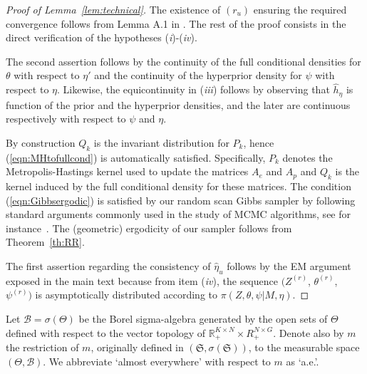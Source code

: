 \documentclass[11pt]{amsart}
\theoremstyle{definition}
\begin{document}
\begin{proof}[Proof of Lemma~\ref{lem:technical}] The existence of
$(r_u)$ ensuring the required convergence follows from Lemma A.1 in 
\cite{C01}. The rest of the proof consists in the direct verification
of the hypotheses (\emph{i})-(\emph{iv}).

The second assertion follows by the continuity of the full conditional
densities for $\theta$ with respect to $\eta'$ and the continuity of
the hyperprior density for $\psi$ with respect to $\eta$. Likewise,
the equicontinuity in (\emph{iii}) follows by observing that $\widehat
h_\eta$ is function of the prior and the hyperprior densities, and the
later are continuous respectively with respect to $\psi$ and $\eta$.

By construction $Q_k$ is the invariant distribution for $P_k$, hence
(\ref{eqn:MHtofullcond}) is automatically satisfied. Specifically,
$P_k$ denotes the Metropolis-Hastings kernel used to update the
matrices $A_e$ and $A_p$ and $Q_k$ is the kernel induced by the full
conditional density for these matrices. The condition
(\ref{eqn:Gibbsergodic}) is satisfied by our random scan Gibbs sampler
by following standard arguments commonly used in the study of MCMC
algorithms, see for instance~\cite{RC}. The (geometric) ergodicity of
our sampler follows from Theorem~\ref{th:RR}.

The first assertion regarding the consistency of $\hat\eta_u$ follows
by the EM argument exposed in the main text because from item
(\emph{iv}), the sequence $(Z^{(r)}$, $\theta^{(r)}$, $\psi^{(r)})$ is 
asymptotically distributed according to $\pi(Z, \theta, \psi|M,
\eta)$.
\end{proof}

Let $\mathcal B = \sigma(\Theta)$ be the Borel sigma-algebra generated
by the open sets of $\Theta$ defined with respect to the vector
topology of $\mathbb R_+^{K\times N} \times R_+^{N\times G}$. Denote
also by $m$ the restriction of $m$, originally defined in
$(\mathfrak S, \sigma(\mathfrak S))$, to the measurable space
$(\Theta, \mathcal B)$. We abbreviate `almost everywhere' with respect
to  $m$ as `a.e.'.
\end{document}
